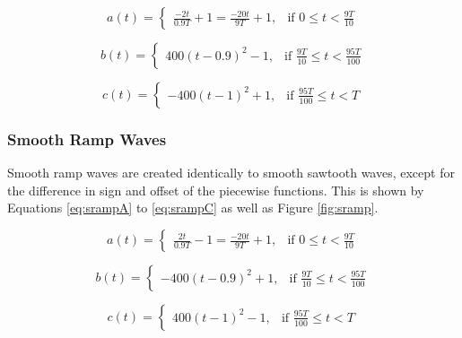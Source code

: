 \begin{equation}
  a(t) =
  \begin{cases}
    \frac{-2t}{0.9T} + 1 = \frac{-20t}{9T} + 1,& \text{if } 0 \leq t < \frac{9T}{10}
  \end{cases}
  \label{eq:ssawA}
\end{equation}

\begin{equation}
  b(t) =
  \begin{cases}
    400(t-0.9)^2 - 1,& \text{if } \frac{9T}{10} \leq t < \frac{95T}{100}
  \end{cases}
  \label{eq:ssawB}
\end{equation}

\begin{equation}
  c(t) =
  \begin{cases}
    -400(t-1)^2 + 1,& \text{if } \frac{95T}{100} \leq t < T
  \end{cases}
  \label{eq:ssawC}
\end{equation}

\pagebreak

\subsubsection{Smooth Ramp Waves}

Smooth ramp waves are created identically to smooth sawtooth waves, except for the difference in sign and offset of the piecewise functions. This is shown by Equations \ref{eq:srampA} to \ref{eq:srampC} as well as Figure \ref{fig:sramp}.

\begin{equation}
  a(t) =
  \begin{cases}
    \frac{2t}{0.9T} - 1 = \frac{-20t}{9T} + 1,& \text{if } 0 \leq t < \frac{9T}{10}
  \end{cases}
  \label{eq:srampA}
\end{equation}

\begin{equation}
  b(t) =
  \begin{cases}
    -400(t-0.9)^2 + 1,& \text{if } \frac{9T}{10} \leq t < \frac{95T}{100}
  \end{cases}
  \label{eq:srampB}
\end{equation}

\begin{equation}
  c(t) =
  \begin{cases}
    400(t-1)^2 - 1,& \text{if } \frac{95T}{100} \leq t < T
  \end{cases}
  \label{eq:srampC}
\end{equation}

